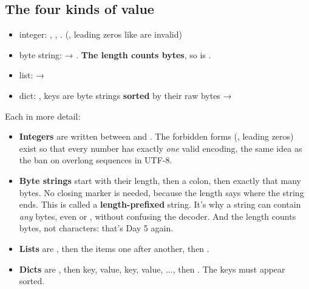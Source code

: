 \documentclass[10pt,a4paper]{article}
\begin{document}
\subsection{The four kinds of value}
\begin{itemize}
\item integer: , , . (, leading zeros like  are invalid)
\item byte string:  → . \textbf{The length counts bytes}, so  is .
\item list:  → 
\item dict: , keys are byte strings \textbf{sorted} by their raw bytes → 
\end{itemize}
Each in more detail:
\begin{itemize}
\item \textbf{Integers} are written between  and . The forbidden forms (, leading zeros) exist so that every number has exactly \emph{one} valid encoding, the same idea as the ban on overlong sequences in UTF-8.
\item \textbf{Byte strings} start with their length, then a colon, then exactly that many bytes. No closing marker is needed, because the length says where the string ends. This is called a \textbf{length-prefixed} string. It’s why a string can contain \emph{any} bytes, even  or \code{:\allowbreak{}}, without confusing the decoder. And the length counts bytes, not characters: that’s Day 5 again.
\item \textbf{Lists} are , then the items one after another, then .
\item \textbf{Dicts} are , then key, value, key, value, ..., then . The keys must appear sorted.
\end{itemize}
\end{document}
